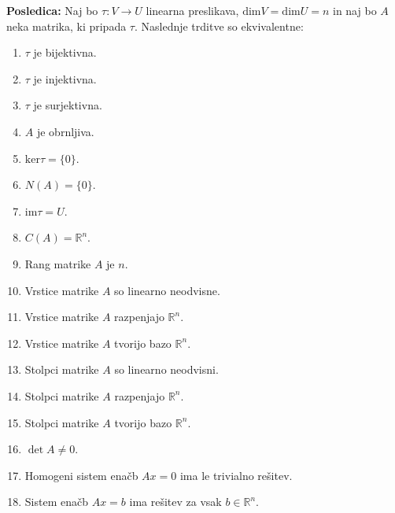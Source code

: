 \documentclass{article}
\begin{document}
\begin{multicols}{2}
\textbf{Posledica:} Naj bo \( \tau: V \rightarrow U \) linearna preslikava, \(\text{dim} V = \text{dim} U = n\) in naj bo \( A \) neka matrika, ki pripada \( \tau \). Naslednje trditve so ekvivalentne:
\begin{enumerate}
    \item \( \tau \) je bijektivna.
    \item \( \tau \) je injektivna.
    \item \( \tau \) je surjektivna.
    \item \( A \) je obrnljiva.
    \item \( \text{ker} \tau = \{0\} \).
    \item \( N(A) = \{0\} \).
    \item \( \text{im} \tau = U \).
    \item \( C(A) = \mathbb{R}^n \).
    \item Rang matrike \( A \) je \( n \).
    \item Vrstice matrike \( A \) so linearno neodvisne.
    \item Vrstice matrike \( A \) razpenjajo \( \mathbb{R}^n \).
    \item Vrstice matrike \( A \) tvorijo bazo \( \mathbb{R}^n \).
    \item Stolpci matrike \( A \) so linearno neodvisni.
    \item Stolpci matrike \( A \) razpenjajo \( \mathbb{R}^n \).
    \item Stolpci matrike \( A \) tvorijo bazo \( \mathbb{R}^n \).
    \item \( \det A \neq 0 \).
    \item Homogeni sistem enačb \( Ax = 0 \) ima le trivialno rešitev.
    \item Sistem enačb \( Ax = b \) ima rešitev za vsak \( b \in \mathbb{R}^n \).
\end{enumerate}



\end{multicols}
\end{document}
